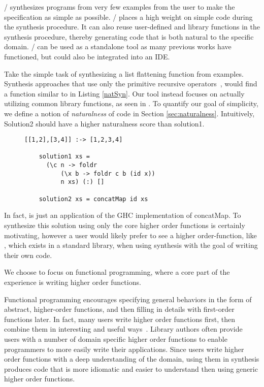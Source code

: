 \ourTool/ synthesizes programs from very few examples from the user to make the specification as simple as possible.
\ourTool/ places a high weight on simple code during the synthesis procedure.
It can also reuse user-defined and library functions in the synthesis procedure, thereby generating code that is both natural to the specific domain.
\ourTool/ can be used as a standalone tool as many previous works have functioned, but could also be integrated into an IDE.

Take the simple task of synthesizing a list flattening function from examples.
Synthesis approaches that use only the primitive recursive operators~\cite{Osera:2015,FeserCD15}, would find a function similar to  in Listing \ref{natSyn}.
Our tool instead focuses on actually utilizing common library functions, as seen in .
To quantify our goal of simplicity, we define a notion of \textit{naturalness} of code in Section \ref{sec:naturalness}.
Intuitively, Solution2 should have a higher naturalness score than solution1.


\begin{figure}
  \begin{lstlisting}[caption=Low-level synthesis vs. Natural synthesis,label=natSyn]
    [[1,2],[3,4]] :-> [1,2,3,4]

    solution1 xs =
      (\c n -> foldr
          (\x b -> foldr c b (id x))
          n xs) (:) []

    solution2 xs = concatMap id xs
    \end{lstlisting}
\end{figure}

\noindent In fact,  is just an application of the GHC\cite{ghc} implementation of concatMap.
To synthesize this solution using only the core higher order functions is certainly motivating, however a user would likely prefer to see a higher order-function, like , which exists in a standard library, when using synthesis with the goal of writing their own code.

We choose to focus on functional programming, where a core part of the experience is writing higher order functions.

Functional programming encourages specifying general behaviors in the form of abstract, higher-order functions, and then filling in details with first-order functions later.
In fact, many users write higher order functions first, then combine them in interesting and useful ways~\cite{Lipovaca:2011}.
Library authors often provide users with a number of domain specific higher order functions to enable programmers to more easily write their applications.
Since users write higher order functions with a deep understanding of the domain, using them in synthesis produces code that is more idiomatic and easier to understand then using generic higher order functions.

